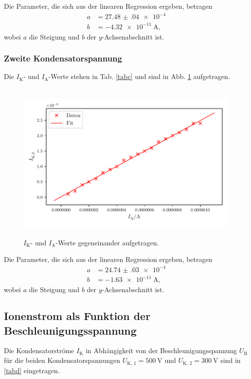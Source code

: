 \noindent Die Parameter, die sich aus der linearen Regression ergeben, betragen
\begin{align*}
    a &= \num{27.48(04)e-4}\\
    b &= \SI{-4.32e-11}{\ampere},
\end{align*}
wobei $a$ die Steigung und $b$ der $y$-Achsenabschnitt ist. 

\subsubsection{Zweite Kondensatorspannung}
Die $I_\text{K}$- und $I_\text{A}$-Werte stehen in Tab. \ref{tabc} und sind in Abb. \ref{fig:plot2} aufgetragen. 

\begin{figure}
    \centering
    \includegraphics[width=15cm, height=8cm]{build/plot2.pdf}
    \caption{$I_\text{K}$- und $I_\text{A}$-Werte gegeneinander aufgetragen.}
    \label{fig:plot2}
\end{figure}

\noindent Die Parameter, die sich aus der linearen Regression ergeben, betragen
\begin{align*}
    a &= \num{24.74(03)e-4}\\
    b &= \SI{-1.63e-11}{\ampere},
\end{align*}
wobei $a$ die Steigung und $b$ der $y$-Achsenabschnitt ist. 



\subsection{Ionenstrom als Funktion der Beschleunigungsspannung}

Die Kondensatorströme $I_\text{K}$ in Abhängigkeit von der
Beschleunigungsspannung $U_\text{B}$ für die beiden Kondensatorspannungen
$U_\text{K, 1} = \SI{500}{\volt}$ und $U_\text{K, 2} = \SI{300}{\volt}$
sind in \ref{tabd} eingetragen.

